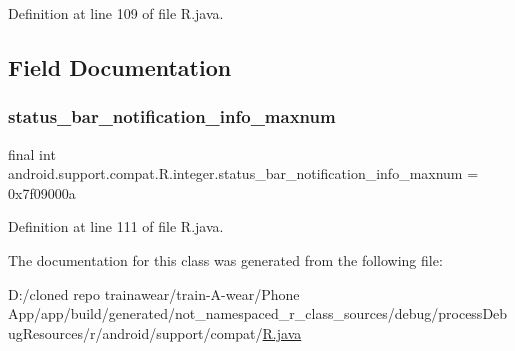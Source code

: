 Definition at line 109 of file R.\+java.


\begin{DoxyCode}{0}

\end{DoxyCode}


\subsection{Field Documentation}
\mbox{\label{classandroid_1_1support_1_1compat_1_1_r_1_1integer_a5d0dcdb625a5957f6a037d53cde095c6}} 
\subsubsection{\texorpdfstring{status\_bar\_notification\_info\_maxnum}{status\_bar\_notification\_info\_maxnum}}
{\footnotesize\ttfamily final int android.\+support.\+compat.\+R.\+integer.\+status\+\_\+bar\+\_\+notification\+\_\+info\+\_\+maxnum = 0x7f09000a\hspace{0.3cm}{\ttfamily [static]}}



Definition at line 111 of file R.\+java.



The documentation for this class was generated from the following file\+:\begin{DoxyCompactItemize}
\item 
D\+:/cloned repo trainawear/train-\/\+A-\/wear/\+Phone App/app/build/generated/not\+\_\+namespaced\+\_\+r\+\_\+class\+\_\+sources/debug/process\+Debug\+Resources/r/android/support/compat/\mbox{\hyperlink{process_debug_resources_2r_2android_2support_2compat_2_r_8java}{R.\+java}}\end{DoxyCompactItemize}

